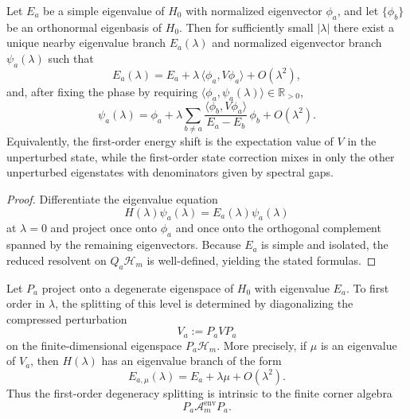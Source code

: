 \documentclass[12pt,a4paper]{article}
\begin{document}
\begin{theorem}
\label{p4:thm:nondeg-perturbation}
Let $E_a$ be a simple eigenvalue of $H_0$ with normalized eigenvector $\phi_a$, and let $\{\phi_b\}$ be an orthonormal eigenbasis of $H_0$.
Then for sufficiently small $|\lambda|$ there exist a unique nearby eigenvalue branch $E_a(\lambda)$ and normalized eigenvector branch $\psi_a(\lambda)$ such that
\begin{equation}
\label{p4:eq:Ea-expansion}
E_a(\lambda)=E_a+\lambda\,\langle \phi_a,V\phi_a\rangle+O(\lambda^2),
\end{equation}
and, after fixing the phase by requiring $\langle\phi_a,\psi_a(\lambda)\rangle\in\mathbb R_{>0}$,
\begin{equation}
\label{p4:eq:psi-first-order}
\psi_a(\lambda)
=
\phi_a
+\lambda\sum_{b\neq a}
\frac{\langle \phi_b,V\phi_a\rangle}{E_a-E_b}\,\phi_b
+O(\lambda^2).
\end{equation}
Equivalently, the first-order energy shift is the expectation value of $V$ in the unperturbed state, while the first-order state correction mixes in only the other unperturbed eigenstates with denominators given by spectral gaps.
\end{theorem}


\begin{proof}
Differentiate the eigenvalue equation
\[
H(\lambda)\psi_a(\lambda)=E_a(\lambda)\psi_a(\lambda)
\]
at $\lambda=0$ and project once onto $\phi_a$ and once onto the orthogonal complement spanned by the remaining eigenvectors.
Because $E_a$ is simple and isolated, the reduced resolvent on $Q_a\mathcal H_m$ is well-defined, yielding the stated formulas.
\end{proof}


\begin{theorem}
\label{p4:thm:degenerate-perturbation}
Let \(P_a\) project onto a degenerate eigenspace of \(H_0\) with eigenvalue
\(E_a\).  To first order in \(\lambda\), the splitting of this level is
determined by diagonalizing the compressed perturbation
\begin{equation}
\label{p4:eq:deg-perturb-block}
V_a:=P_a V P_a
\end{equation}
on the finite-dimensional eigenspace \(P_a\mathcal H_m\).  More precisely, if
\(\mu\) is an eigenvalue of \(V_a\), then \(H(\lambda)\) has an eigenvalue
branch of the form
\begin{equation}
\label{p4:eq:deg-splitting}
E_{a,\mu}(\lambda)=E_a+\lambda\mu+O(\lambda^2).
\end{equation}
Thus the first-order degeneracy splitting is intrinsic to the finite corner
algebra
\[
  P_a\mathcal A_m^{\mathrm{env}}P_a .
\]
\end{theorem}
\end{document}
